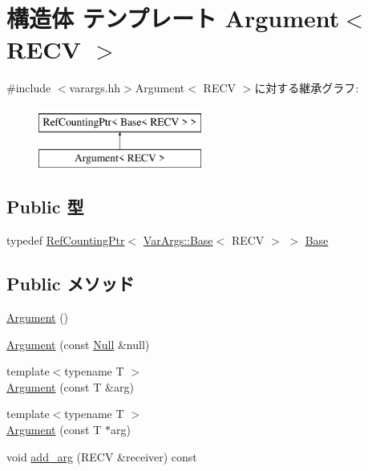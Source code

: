 \hypertarget{structVarArgs_1_1Argument}{
\section{構造体 テンプレート Argument$<$ RECV $>$}
\label{structVarArgs_1_1Argument}
}


{\ttfamily \#include $<$varargs.hh$>$}Argument$<$ RECV $>$に対する継承グラフ:\begin{figure}[H]
\begin{center}
\leavevmode
\includegraphics[height=2cm]{structVarArgs_1_1Argument}
\end{center}
\end{figure}
\subsection*{Public 型}
\begin{DoxyCompactItemize}
\item 
typedef \hyperlink{classRefCountingPtr}{RefCountingPtr}$<$ \hyperlink{structVarArgs_1_1Base}{VarArgs::Base}$<$ RECV $>$ $>$ \hyperlink{structVarArgs_1_1Argument_ade0d195165b441ade8d9d192eb0623b8}{Base}
\end{DoxyCompactItemize}
\subsection*{Public メソッド}
\begin{DoxyCompactItemize}
\item 
\hyperlink{structVarArgs_1_1Argument_aedc8c00f523413f83bf6652cbd05bf30}{Argument} ()
\item 
\hyperlink{structVarArgs_1_1Argument_ab9a66e116a24e629db197d6df650b5fc}{Argument} (const \hyperlink{structVarArgs_1_1Null}{Null} \&null)
\item 
{\footnotesize template$<$typename T $>$ }\\\hyperlink{structVarArgs_1_1Argument_aa927dd000603438388aea5018bc34253}{Argument} (const T \&arg)
\item 
{\footnotesize template$<$typename T $>$ }\\\hyperlink{structVarArgs_1_1Argument_abb9eddb942cbe7d2852e3b4f87d5a984}{Argument} (const T $\ast$arg)
\item 
void \hyperlink{structVarArgs_1_1Argument_a98ba5fcf8063dec1f05833d6eba61854}{add\_\-arg} (RECV \&receiver) const 
\end{DoxyCompactItemize}
